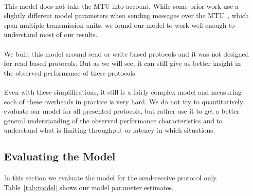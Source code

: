 \paragraph{} This model does not take the MTU into account. While some prior work use a slightly different model parameters 
when sending messages over the MTU~\cite{dare}, which span multiple transmission units, we found our model to work well
enough to understand most of our results.

\paragraph{} We built this model around send or write based protocols and it was not designed 
for read based protocols. But as we will see, it can still give us better insight in the observed performance of these 
protocols.

\paragraph{} Even with these simplifications, it still is a fairly complex model and measuring each of these overheads in 
practice is very hard. We do not try to quantitatively evaluate our model for all presented protocols, but rather use it to
get a better general understanding of the observed performance characteristics and to understand what is limiting throughput
or latency in which situations.

\pagebreak
\subsection{Evaluating the Model}

\paragraph{} In this section we evaluate the model for the send-receive protocol only. Table~\ref{tab:model} shows our model
parameter estimates. 

